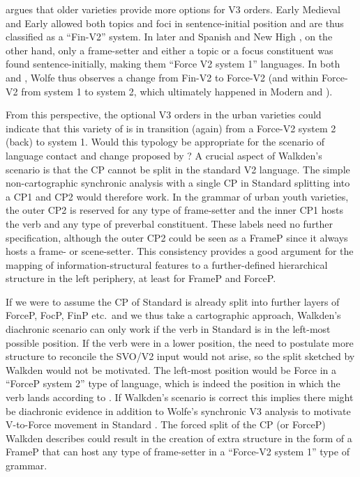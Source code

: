 \documentclass[output=paper]{langsci/langscibook}
\begin{document}
\noindent \citet{Wolfe:2017} argues that older  varieties provide more
options for V3 orders. Early Medieval  and Early  allowed
both topics and foci in sentence-initial position and are thus classified as a
\enquote{Fin-V2} system. In later  and Spanish and New High ,
on the other hand, only a frame-setter and either a topic or a focus
constituent was found sentence-initially, making them \enquote{Force V2 system 1} 
languages.  In both  and , Wolfe thus observes a change from
Fin-V2 to Force-V2 (and within Force-V2 from system 1 to system 2, which
ultimately happened in Modern  and ).

From this perspective, the optional V3 orders in the
 urban varieties could indicate that this variety of  is
in transition (again) from a Force-V2 system 2 (back) to system 1. Would this
typology be appropriate for the scenario of language contact and change
proposed by \citet{Walkden:2017}? A crucial aspect of Walkden's scenario is
that the CP cannot be split in the standard V2 language. The
simple non-cartographic synchronic analysis with a single CP in Standard
 splitting into a CP1 and CP2 would therefore work.  In the grammar
of  urban youth varieties, the outer CP2 is reserved for any type of
frame-setter and the inner CP1 hosts the verb and any type of preverbal
constituent. These labels need no further specification, although the outer CP2
could be seen as a FrameP since it always hosts a frame- or scene-setter. This
consistency provides a good argument for the  mapping of information-structural
features to a further-defined hierarchical structure in the left periphery, at
least for FrameP and ForceP.

If we were to assume the CP of Standard  is already split into
further layers of ForceP, FocP, FinP etc.\ and we thus take a cartographic
approach, Walkden's diachronic scenario can only work if the verb in Standard
 is in the left-most possible position. If the verb were in a lower
position, the need to postulate more structure to reconcile the SVO/V2 input
would not arise, so the split sketched by Walkden would not be motivated. The
left-most position would be Force in a \enquote{ForceP system 2} type of
language, which is indeed the position in which the verb lands according to
\citet{Wolfe:2017}. If Walkden's scenario is correct this implies there might
be diachronic evidence in addition to Wolfe's synchronic V3
analysis to motivate V-to-Force movement in Standard
. The forced split of the CP (or ForceP) Walkden describes could
result in the creation of extra structure in the form of a FrameP that can host
any type of frame-setter in a \enquote{Force-V2 system 1} type of grammar.
\end{document}

